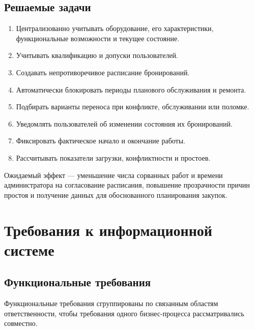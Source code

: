 \documentclass[12pt,a4paper]{article}
\begin{document}
\subsection{Решаемые задачи}

\begin{enumerate}
    \item Централизованно учитывать оборудование, его характеристики,
    функциональные возможности и текущее состояние.
    \item Учитывать квалификацию и допуски пользователей.
    \item Создавать непротиворечивое расписание бронирований.
    \item Автоматически блокировать периоды планового обслуживания и ремонта.
    \item Подбирать варианты переноса при конфликте, обслуживании или поломке.
    \item Уведомлять пользователей об изменении состояния их бронирований.
    \item Фиксировать фактическое начало и окончание работы.
    \item Рассчитывать показатели загрузки, конфликтности и простоев.
\end{enumerate}

Ожидаемый эффект --- уменьшение числа сорванных работ и времени администратора
на согласование расписания, повышение прозрачности причин простоя и получение
данных для обоснованного планирования закупок.

\section{Требования к информационной системе}

\subsection{Функциональные требования}

Функциональные требования сгруппированы по связанным областям ответственности,
чтобы требования одного бизнес-процесса рассматривались совместно.
\end{document}
